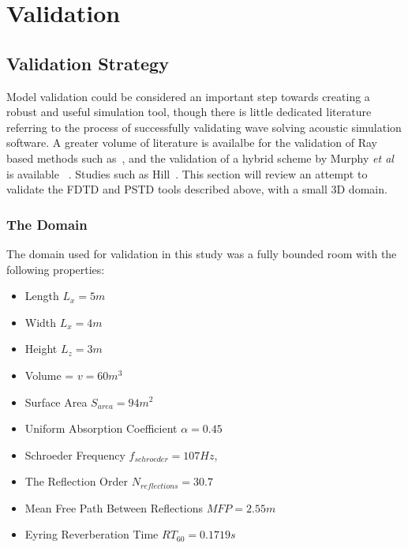 
\chapter{Validation}
\section{Validation Strategy}
Model validation could be considered an important step towards creating a robust and useful simulation tool, though there is little dedicated literature referring to the process of successfully validating wave solving acoustic simulation software. A greater volume of literature is availalbe for the validation of Ray based methods such as~\cite{Ahnert2005,Tsingos2002,Foteinou2010}, and the validation of a hybrid scheme by Murphy \textit{et al} is available ~\cite{Southern2013}. Studies such as Hill~\cite{Hill2012}. This section will review an attempt to validate the FDTD and PSTD tools described above, with a small 3D domain.\\

\subsection{The Domain}
The domain used for validation in this study was a fully bounded room with the following properties:\\

\begin{itemize}
\item Length $L_x = 5m$
\item Width $L_x = 4m$
\item Height $L_z = 3m$
\item Volume = $ v = 60m^3$
\item Surface Area $S_{area} = 94m^2$
\item Uniform Absorption Coefficient $\alpha = 0.45 $
\item Schroeder Frequency  $f_{schroeder} = 107Hz $,
\item The Reflection Order $N_{reflections} = 30.7$
\item Mean Free Path Between Reflections $MFP = 2.55m$
\item Eyring Reverberation Time $RT_{60} = 0.1719s $
\end{itemize}

